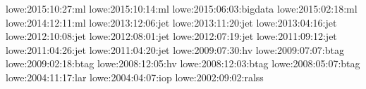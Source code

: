 \nocite{talks}{lowe:2015:10:27:ml}
\nocite{talks}{lowe:2015:10:14:ml}
\nocite{talks}{lowe:2015:06:03:bigdata}
\nocite{talks}{lowe:2015:02:18:ml}
\nocite{talks}{lowe:2014:12:11:ml}
\nocite{talks}{lowe:2013:12:06:jet}
\nocite{talks}{lowe:2013:11:20:jet}
\nocite{talks}{lowe:2013:04:16:jet}
\nocite{talks}{lowe:2012:10:08:jet}
\nocite{talks}{lowe:2012:08:01:jet}
\nocite{talks}{lowe:2012:07:19:jet}
\nocite{talks}{lowe:2011:09:12:jet}
\nocite{talks}{lowe:2011:04:26:jet}
\nocite{talks}{lowe:2011:04:20:jet}
\nocite{talks}{lowe:2009:07:30:hv}
\nocite{talks}{lowe:2009:07:07:btag}
\nocite{talks}{lowe:2009:02:18:btag}
\nocite{talks}{lowe:2008:12:05:hv}
\nocite{talks}{lowe:2008:12:03:btag}
\nocite{talks}{lowe:2008:05:07:btag}
\nocite{talks}{lowe:2004:11:17:lar}
\nocite{talks}{lowe:2004:04:07:iop}
\nocite{talks}{lowe:2002:09:02:ralss}
